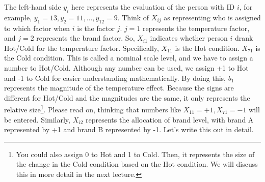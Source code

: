 \documentclass{ltjbook}
\begin{document}
The left-hand side $y_i$ here represents the evaluation of the person with ID $i$, for example, $y_1=13, y_2=11, ..., y_{12}=9$.
Think of $X_{ij}$ as representing who is assigned to which factor when $i$ is the factor $j$. $j=1$ represents the temperature factor, and $j=2$ represents the brand factor. So, $X_{i1}$ indicates whether person $i$ drank Hot/Cold for the temperature factor. Specifically, $X_{11}$ is the Hot condition. $X_{71}$ is the Cold condition. This is called a nominal scale level, and we have to assign a number to Hot/Cold. Although any number can be used, we assign +1 to Hot and -1 to Cold for easier understanding mathematically. By doing this, $b_1$ represents the magnitude of the temperature effect. Because the signs are different for Hot/Cold and the magnitudes are the same, it only represents the relative size\footnote{You could also assign 0 to Hot and 1 to Cold. Then, it represents the size of the change in the Cold condition based on the Hot condition. We will discuss this in more detail in the next lecture.}. Please read on, thinking that numbers like $X_{11}=+1,X_{71}=-1$ will be entered. Similarly, $X_{i2}$ represents the allocation of brand level, with brand A represented by +1 and brand B represented by -1. Let's write this out in detail.
\end{document}
